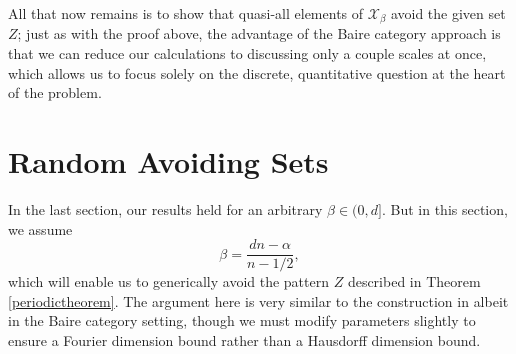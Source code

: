 \documentclass[12pt,reqno]{article}
\numberwithin{equation}{section}
\begin{document}
All that now remains is to show that quasi-all elements of $\mathcal{X}_\beta$ avoid the given set $Z$; just as with the proof above, the advantage of the Baire category approach is that we can reduce our calculations to discussing only a couple scales at once, which allows us to focus solely on the discrete, quantitative question at the heart of the problem.

\section{Random Avoiding Sets}

In the last section, our results held for an arbitrary $\beta \in (0,d]$. But in this section, we assume
%
\[ \beta = \frac{dn - \alpha}{n - 1/2}, \]
%
which will enable us to generically avoid the pattern $Z$ described in Theorem \ref{periodictheorem}. The argument here is very similar to the construction in \cite{OurPaper} albeit in the Baire category setting, though we must modify parameters slightly to ensure a Fourier dimension bound rather than a Hausdorff dimension bound.
\end{document}
